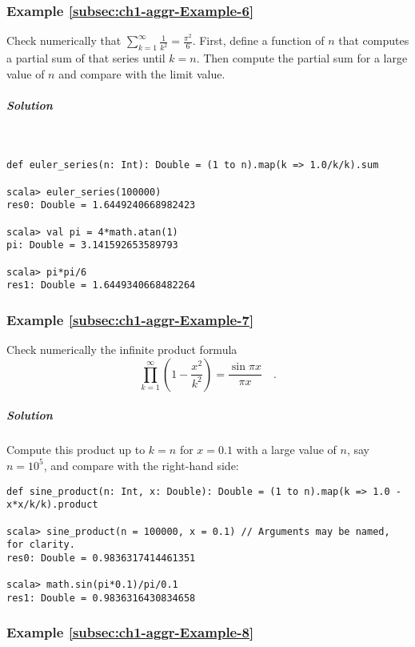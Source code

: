 \subsubsection{Example \label{subsec:ch1-aggr-Example-6}\ref{subsec:ch1-aggr-Example-6}}

Check numerically that $\sum_{k=1}^{\infty}\frac{1}{k^{2}}=\frac{\pi^{2}}{6}$.
First, define a function of $n$ that computes a partial sum of that
series until $k=n$. Then compute the partial sum for a large value
of $n$ and compare with the limit value.

\subparagraph{Solution}

~

\begin{lstlisting}
def euler_series(n: Int): Double = (1 to n).map(k => 1.0/k/k).sum

scala> euler_series(100000)
res0: Double = 1.6449240668982423

scala> val pi = 4*math.atan(1)
pi: Double = 3.141592653589793

scala> pi*pi/6
res1: Double = 1.6449340668482264 
\end{lstlisting}


\subsubsection{Example \label{subsec:ch1-aggr-Example-7}\ref{subsec:ch1-aggr-Example-7}}

Check numerically the infinite product formula
\[
\prod_{k=1}^{\infty}\left(1-\frac{x^{2}}{k^{2}}\right)=\frac{\sin\pi x}{\pi x}\quad.
\]


\subparagraph{Solution}

Compute this product up to $k=n$ for $x=0.1$ with a large value
of $n$, say $n=10^{5}$, and compare with the right-hand side:
\begin{lstlisting}
def sine_product(n: Int, x: Double): Double = (1 to n).map(k => 1.0 - x*x/k/k).product

scala> sine_product(n = 100000, x = 0.1) // Arguments may be named, for clarity.
res0: Double = 0.9836317414461351

scala> math.sin(pi*0.1)/pi/0.1
res1: Double = 0.9836316430834658
\end{lstlisting}


\subsubsection{Example \label{subsec:ch1-aggr-Example-8}\ref{subsec:ch1-aggr-Example-8}}

